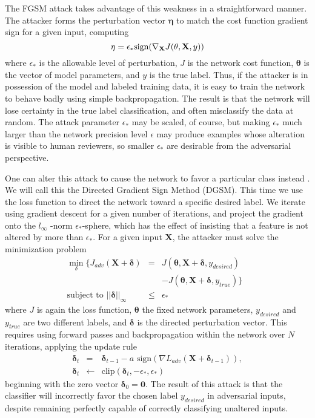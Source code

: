 \documentclass[conference]{IEEEtran}
\begin{document}
The FGSM attack \cite{goodfellow2014explaining} takes advantage of this
weakness in a straightforward manner. The attacker forms the perturbation
vector $\mathbf{\eta }$ to match the cost function gradient sign for a given
input, computing 
\begin{equation*}
\mathbf{\eta }=\epsilon _{\ast }\text{sign}(\nabla _{\mathbf{X}}J(\mathbf{%
\theta },\mathbf{X},y))
\end{equation*}%
where $\epsilon _{\ast }$ is the allowable level of perturbation, $J$ is the
network cost function, $\mathbf{\theta }$ is the vector of model parameters,
and $y$ is the true label. Thus, if the attacker is in possession of the
model and labeled training data, it is easy to train the network to behave
badly using simple backpropagation. The result is that the network will lose
certainty in the true label classification, and often misclassify the data
at random. The attack parameter $\epsilon _{\ast }$ may be scaled, of
course, but making $\epsilon _{\ast }$ much larger than the network
precision level $\epsilon $ may produce examples whose alteration is visible
to human reviewers, so smaller $\epsilon _{\ast }$ are desirable from the
adversarial perspective.

One can alter this attack to cause the network to favor a particular class
instead \cite{madry2020adversarial}. We will call this the Directed Gradient
Sign Method (DGSM). This time we use the loss function to direct the network
toward a specific desired label. We iterate using gradient descent for a
given number of iterations, and project the gradient onto the $l_{\infty }$%
-norm $\epsilon _{\ast }$-sphere, which has the effect of insisting that a
feature is not altered by more than $\epsilon _{\ast }$. For a given input $%
\mathbf{X}$, the attacker must solve the minimization problem 
\begin{eqnarray*}
\min_{\delta }\{J_{adv}(\mathbf{X}+\mathbf{\delta }) &=&J(\mathbf{\theta },%
\mathbf{X}+\mathbf{\delta },y_{desired}) \\
&&-J(\mathbf{\theta },\mathbf{X}+\mathbf{\delta },y_{true})\}\text{ } \\
\text{subject to }\left\vert \left\vert \mathbf{\delta }\right\vert
\right\vert _{\infty } &\leq &\epsilon _{\ast }
\end{eqnarray*}%
where $J$ is again the loss function, $\mathbf{\theta }$ the fixed network
parameters, $y_{desired}$ and $y_{true}$ are two different labels, and $%
\mathbf{\delta }$ is the directed perturbation vector. This requires using
forward passes and backpropagation within the network over $N$ iterations,
applying the update rule%
\begin{eqnarray*}
\mathbf{\delta }_{t} &=&\mathbf{\delta }_{t-1}-a\text{ sign}(\nabla L_{adv}(%
\mathbf{X}+\mathbf{\delta }_{t-1})), \\
\mathbf{\delta }_{t} &\leftarrow &\text{clip}(\mathbf{\delta }_{t},-\epsilon
_{\ast },\epsilon _{\ast })
\end{eqnarray*}%
beginning with the zero vector $\mathbf{\delta }_{0}=\mathbf{0}$. The result
of this attack is that the classifier will incorrectly favor the chosen
label $y_{desired}$ in adversarial inputs, despite remaining perfectly
capable of correctly classifying unaltered inputs.
\end{document}
